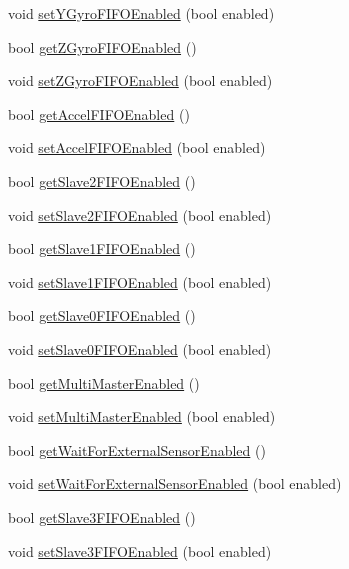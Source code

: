 \begin{DoxyCompactItemize}
\item 
void \hyperlink{class_m_p_u6050_a16eb12bbf07bc17a9d852941d834175e}{set\+Y\+Gyro\+F\+I\+F\+O\+Enabled} (bool enabled)
\item 
bool \hyperlink{class_m_p_u6050_adbbbd131c74f37dd545403633eb317ff}{get\+Z\+Gyro\+F\+I\+F\+O\+Enabled} ()
\item 
void \hyperlink{class_m_p_u6050_af5b5bc39b66466ba910f6eef1259444c}{set\+Z\+Gyro\+F\+I\+F\+O\+Enabled} (bool enabled)
\item 
bool \hyperlink{class_m_p_u6050_ace244415128ad7a38293ad6808b7face}{get\+Accel\+F\+I\+F\+O\+Enabled} ()
\item 
void \hyperlink{class_m_p_u6050_afccbee85f5cdc95098f6d62d8d417c3f}{set\+Accel\+F\+I\+F\+O\+Enabled} (bool enabled)
\item 
bool \hyperlink{class_m_p_u6050_a3c2e29508607a655221a2fa4f4219b4d}{get\+Slave2\+F\+I\+F\+O\+Enabled} ()
\item 
void \hyperlink{class_m_p_u6050_a38a10ac4f30b96718ec021dc0db8587b}{set\+Slave2\+F\+I\+F\+O\+Enabled} (bool enabled)
\item 
bool \hyperlink{class_m_p_u6050_afd6a9b55a589c83c9a0fb0b5b2a88234}{get\+Slave1\+F\+I\+F\+O\+Enabled} ()
\item 
void \hyperlink{class_m_p_u6050_a5d432fa2fb8b2227f50aa5c7b5befb66}{set\+Slave1\+F\+I\+F\+O\+Enabled} (bool enabled)
\item 
bool \hyperlink{class_m_p_u6050_a6aa7aa2e3fac06f8b5ab9ee127255a5e}{get\+Slave0\+F\+I\+F\+O\+Enabled} ()
\item 
void \hyperlink{class_m_p_u6050_a97fbf27e1b827f9dfc3c28ff376b54c4}{set\+Slave0\+F\+I\+F\+O\+Enabled} (bool enabled)
\item 
bool \hyperlink{class_m_p_u6050_aa88483068837bd9bc9c9f6c59a7a79b7}{get\+Multi\+Master\+Enabled} ()
\item 
void \hyperlink{class_m_p_u6050_a039f5724974c5bf3f373ed9be031441c}{set\+Multi\+Master\+Enabled} (bool enabled)
\item 
bool \hyperlink{class_m_p_u6050_a4e2ebda47b85b4c5463f041c790bf5c0}{get\+Wait\+For\+External\+Sensor\+Enabled} ()
\item 
void \hyperlink{class_m_p_u6050_a20dc4bdedbe1550580c28a6d090291be}{set\+Wait\+For\+External\+Sensor\+Enabled} (bool enabled)
\item 
bool \hyperlink{class_m_p_u6050_a9d75ec63e2320ecfb84a2b082397f900}{get\+Slave3\+F\+I\+F\+O\+Enabled} ()
\item 
void \hyperlink{class_m_p_u6050_a6ed713870c7f6d085ded91a45515a36c}{set\+Slave3\+F\+I\+F\+O\+Enabled} (bool enabled)

\end{DoxyCompactItemize}
